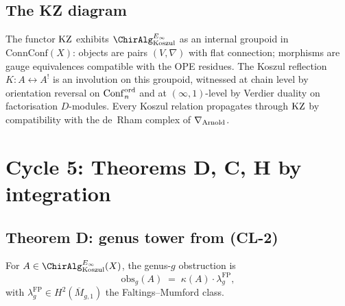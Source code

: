 \subsection{The KZ diagram}

\begin{remark}
\label{rem:climax17-koszul-fibration}
The functor $\mathrm{KZ}$ exhibits $\ChirAlg^{E_\infty}_{\mathrm{Koszul}}$ as
an internal groupoid in $\mathrm{ConnConf}(X)$: objects are pairs
$(V,\nabla)$ with flat connection; morphisms are gauge equivalences
compatible with the OPE residues. The Koszul reflection
$K\colon A\leftrightarrow A^!$ is an involution on this groupoid,
witnessed at chain level by orientation reversal on $\operatorname{Conf}_n^{\mathrm{ord}}$
and at $(\infty,1)$-level by Verdier duality on factorisation
$D$-modules. Every Koszul relation propagates through $\mathrm{KZ}$ by
compatibility with the de~Rham complex of $\nabla_{\mathrm{Arnold}}$.
\end{remark}

\section{Cycle 5: Theorems D, C, H by integration}
\label{sec:climax17-cycle5}

\subsection{Theorem D: genus tower from (CL-2)}

\begin{corollary}[Theorem D]
\label{cor:climax17-theoremD-from-climax}
\ClaimStatusProvedHere
For $A\in\ChirAlg^{E_\infty}_{\mathrm{Koszul}}(X)$, the genus-$g$
obstruction is
\[
  \mathrm{obs}_g(A)\;=\;\kappa(A)\cdot\lambda_g^{\mathrm{FP}},
\]
with $\lambda_g^{\mathrm{FP}}\in H^2(\overline{M}_{g,1})$ the
Faltings--Mumford class.
\end{corollary}

